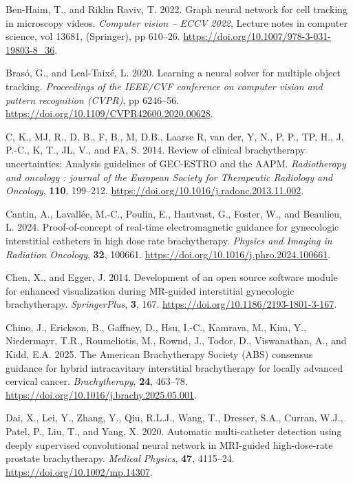 \documentclass[
  11pt,
]{article}
\newlength{\cslhangindent}
\newenvironment{CSLReferences}[2] %
 {\begin{list}{}{%
  \setlength{\itemindent}{0pt}
  \setlength{\leftmargin}{0pt}
  \setlength{\parsep}{0pt}
  \ifodd #1
   \setlength{\leftmargin}{\cslhangindent}
   \setlength{\itemindent}{-1\cslhangindent}
  \fi
  \setlength{\itemsep}{#2\baselineskip}}}
 {\end{list}}
\begin{document}
\begin{CSLReferences}{1}{1}
Ben-Haim, T., and Riklin Raviv, T. 2022. Graph neural network for cell
tracking in microscopy videos. \emph{Computer vision -- ECCV 2022},
Lecture notes in computer science, vol 13681, (Springer), pp 610--26.
\url{https://doi.org/10.1007/978-3-031-19803-8_36}.

Brasó, G., and Leal-Taixé, L. 2020. Learning a neural solver for
multiple object tracking. \emph{Proceedings of the IEEE/CVF conference
on computer vision and pattern recognition (CVPR)}, pp 6246--56.
\url{https://doi.org/10.1109/CVPR42600.2020.00628}.

C, K., MJ, R., D, B., F, B., M, D.B., Laarse R, van der, Y, N., P, P.,
TP, H., J, P.-C., K, T., JL, V., and FA, S. 2014. Review of clinical
brachytherapy uncertainties: Analysis guidelines of GEC-ESTRO and the
AAPM. \emph{Radiotherapy and oncology : journal of the European Society
for Therapeutic Radiology and Oncology}, \textbf{110}, 199--212.
\url{https://doi.org/10.1016/j.radonc.2013.11.002}.

Cantin, A., Lavallée, M.-C., Poulin, E., Hautvast, G., Foster, W., and
Beaulieu, L. 2024. Proof-of-concept of real-time electromagnetic
guidance for gynecologic interstitial catheters in high dose rate
brachytherapy. \emph{Physics and Imaging in Radiation Oncology},
\textbf{32}, 100661. \url{https://doi.org/10.1016/j.phro.2024.100661}.

Chen, X., and Egger, J. 2014. Development of an open source software
module for enhanced visualization during MR-guided interstitial
gynecologic brachytherapy. \emph{SpringerPlus}, \textbf{3}, 167.
\url{https://doi.org/10.1186/2193-1801-3-167}.

Chino, J., Erickson, B., Gaffney, D., Hsu, I.-C., Kamrava, M., Kim, Y.,
Niedermayr, T.R., Roumeliotis, M., Rownd, J., Todor, D., Viswanathan,
A., and Kidd, E.A. 2025. The {American Brachytherapy Society} ({ABS})
consensus guidance for hybrid intracavitary interstitial brachytherapy
for locally advanced cervical cancer. \emph{Brachytherapy}, \textbf{24},
463--78. \url{https://doi.org/10.1016/j.brachy.2025.05.001}.

Dai, X., Lei, Y., Zhang, Y., Qiu, R.L.J., Wang, T., Dresser, S.A.,
Curran, W.J., Patel, P., Liu, T., and Yang, X. 2020. Automatic
multi-catheter detection using deeply supervised convolutional neural
network in {MRI}-guided high-dose-rate prostate brachytherapy.
\emph{Medical Physics}, \textbf{47}, 4115--24.
\url{https://doi.org/10.1002/mp.14307}.


\end{CSLReferences}
\end{document}
